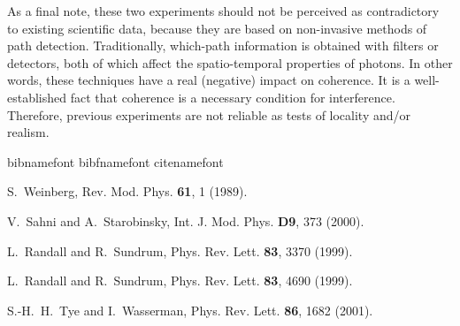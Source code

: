 \documentclass[a4paper,aps,prl,twocolumn,showpacs]{revtex4}
\begin{document}
As a final note, these two experiments should not be perceived as
contradictory to existing scientific data, because they are based
on non-invasive methods of path detection. Traditionally,
which-path information is obtained with filters or detectors, both
of which affect the spatio-temporal properties of photons. In
other words, these techniques have a real (negative) impact on
coherence. It is a well-established fact that coherence is a
necessary condition for interference. Therefore, previous
experiments are not reliable as tests of locality and/or realism.




\begin{thebibliography}{21}

\expandafter\ifx\csname bibnamefont\endcsname\relax
  \def\bibnamefont#1{#1}\fi
\expandafter\ifx\csname bibfnamefont\endcsname\relax
  \def\bibfnamefont#1{#1}\fi
\expandafter\ifx\csname citenamefont\endcsname\relax
  \def\citenamefont#1{#1}\fi
\providecommand{\bibinfo}[2]{#2}
\providecommand{\eprint}[2][]{\url{#2}}

\bibinfo{author}{\bibfnamefont{S.}~\bibnamefont{Weinberg}},
  \bibinfo{journal}{Rev. Mod. Phys.} \textbf{\bibinfo{volume}{61}},
  \bibinfo{pages}{1} (\bibinfo{year}{1989}).

\bibinfo{author}{\bibfnamefont{V.}~\bibnamefont{Sahni}} \bibnamefont{and}
  \bibinfo{author}{\bibfnamefont{A.}~\bibnamefont{Starobinsky}},
  \bibinfo{journal}{Int. J. Mod. Phys.} \textbf{\bibinfo{volume}{D9}},
  \bibinfo{pages}{373} (\bibinfo{year}{2000}).

\bibinfo{author}{\bibfnamefont{L.}~\bibnamefont{Randall}} \bibnamefont{and}
  \bibinfo{author}{\bibfnamefont{R.}~\bibnamefont{Sundrum}},
  \bibinfo{journal}{Phys. Rev. Lett.} \textbf{\bibinfo{volume}{83}},
  \bibinfo{pages}{3370} (\bibinfo{year}{1999}).

\bibinfo{author}{\bibfnamefont{L.}~\bibnamefont{Randall}} \bibnamefont{and}
  \bibinfo{author}{\bibfnamefont{R.}~\bibnamefont{Sundrum}},
  \bibinfo{journal}{Phys. Rev. Lett.} \textbf{\bibinfo{volume}{83}},
  \bibinfo{pages}{4690} (\bibinfo{year}{1999}).

\bibinfo{author}{\bibfnamefont{S.-H.~H.}~\bibnamefont{Tye}} \bibnamefont{and}
  \bibinfo{author}{\bibfnamefont{I.}~\bibnamefont{Wasserman}},
  \bibinfo{journal}{Phys. Rev. Lett.} \textbf{\bibinfo{volume}{86}},
  \bibinfo{pages}{1682} (\bibinfo{year}{2001}).


\end{thebibliography}
\end{document}
